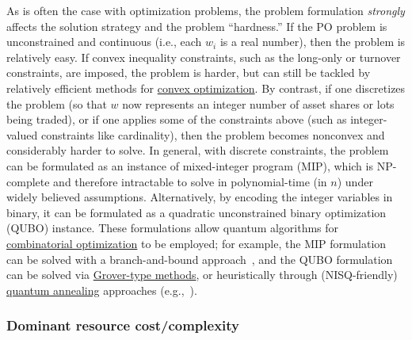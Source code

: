 \begin{refsection}
As is often the case with optimization problems, the problem formulation \textit{strongly} affects the solution strategy and the problem ``hardness.'' If the PO problem is unconstrained and continuous (i.e., each $w_i$ is a real number), then the problem is relatively easy. If convex inequality constraints, such as the long-only  or turnover constraints, are imposed, the problem is harder, but can still be tackled by relatively efficient methods for \hyperref[appl:ContinuousOpt]{convex optimization}. By contrast, if one discretizes the problem (so that $w$ now represents an integer number of asset shares or lots being traded), or if one applies some of the constraints above (such as integer-valued constraints like cardinality), then the problem becomes nonconvex and considerably harder to solve. In general, with discrete constraints, the problem can be formulated as an instance of mixed-integer program (MIP), which is NP-complete and therefore intractable to solve in polynomial-time (in $n$) under widely believed assumptions. Alternatively, by encoding the integer variables in binary, it can be formulated as a quadratic unconstrained binary optimization (QUBO) instance. These formulations allow quantum algorithms for \hyperref[appl:CombOpt]{combinatorial optimization} to be employed; for example, the MIP formulation can be solved with a branch-and-bound approach~\cite{chakrabarti2022universal}, and the QUBO formulation can be solved via \hyperref[appl:SearchAlgorithms]{Grover-type methods}, or heuristically through (NISQ-friendly) \hyperref[prim:QuantumAdiabaticAlgorithm]{quantum annealing} approaches (e.g.,~\cite{mugel2022dynamic}). 


\subsubsection*{Dominant resource cost/complexity}


\end{refsection}
